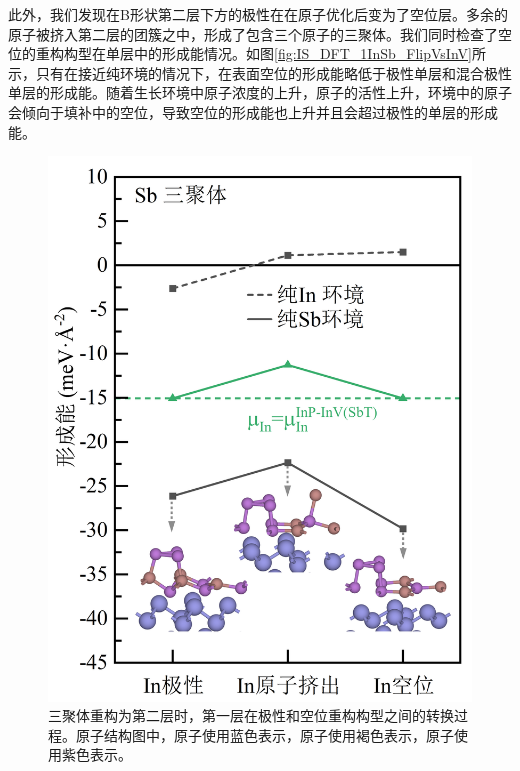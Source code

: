 此外，我们发现在B形状第二层下方的极性在在原子优化后变为了空位层。多余的原子被挤入第二层的团簇之中，形成了包含三个原子的三聚体。我们同时检查了空位的重构构型在单层中的形成能情况。如图\ref{fig:IS_DFT_1InSb_FlipVsInV}所示，只有在接近纯环境的情况下，在表面空位的形成能略低于极性单层和混合极性单层的形成能。随着生长环境中原子浓度的上升，原子的活性上升，环境中的原子会倾向于填补中的空位，导致空位的形成能也上升并且会超过极性的单层的形成能。

\begin{figure}[htb]
    \includegraphics{pic/IS_DFT_2InSb_InPtoInV.png}
    \caption{三聚体重构为第二层时，第一层在极性和空位重构构型之间的转换过程。原子结构图中，原子使用蓝色表示，原子使用褐色表示，原子使用紫色表示。}
    \label{fig:IS_DFT_2InSb_InPtoInV}
\end{figure}

